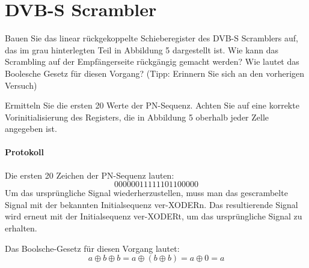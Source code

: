 \documentclass[10pt]{scrreprt}
\begin{document}
    \section{DVB-S Scrambler}
    Bauen Sie das linear rückgekoppelte Schieberegister des DVB-S Scramblers auf, das im
    grau hinterlegten Teil in Abbildung 5 dargestellt ist. Wie kann das Scrambling auf der
    Empfängerseite rückgängig gemacht werden? Wie lautet das Boolesche Gesetz für diesen
    Vorgang? (Tipp: Erinnern Sie sich an den vorherigen Versuch)

    \vspace{.5cm}

    Ermitteln Sie die ersten 20 Werte der PN-Sequenz. Achten Sie auf eine korrekte
    Vorinitialisierung des Registers, die in Abbildung 5 oberhalb jeder Zelle angegeben ist.

    \paragraph{Protokoll}
    Die ersten 20 Zeichen der PN-Sequenz lauten:
    \begin{equation*}
        00000011111101100000
    \end{equation*}
    Um das ursprüngliche Signal wiederherzustellen, muss man das gescrambelte
    Signal mit der bekannten Initialsequenz ver-XODERn. Das resultierende Signal
    wird erneut mit der Initialsequenz ver-XODERt, um das ursprüngliche Signal
    zu erhalten.

    \vspace{.5cm}

    Das Boolsche-Gesetz für diesen Vorgang lautet:
    \begin{equation*}
        a \oplus b \oplus b = a \oplus (b \oplus b) = a \oplus 0 = a
    \end{equation*}
\end{document}
